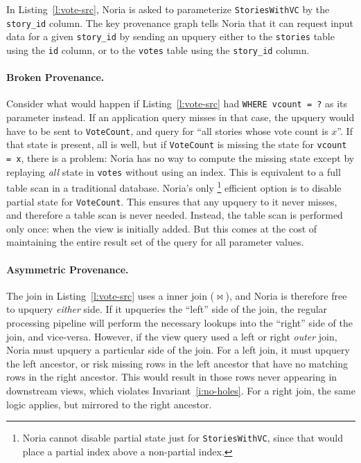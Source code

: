 In Listing~\ref{l:vote-src}, Noria is asked to parameterize
\texttt{StoriesWithVC} by the \texttt{story\_id} column. The key provenance
graph tells Noria that it can request input data for a given \texttt{story\_id}
by sending an upquery either to the \texttt{stories} table using the \texttt{id}
column, or to the \texttt{votes} table using the \texttt{story\_id} column.

\paragraph{Broken Provenance.}
Consider what would happen if Listing~\ref{l:vote-src} had \texttt{WHERE vcount
= ?} as its parameter instead. If an application query misses in that case, the
upquery would have to be sent to \texttt{VoteCount}, and query for ``all stories
whose vote count is $x$''. If that state is present, all is well, but if
\texttt{VoteCount} is missing the state for \texttt{vcount = x}, there is a
problem: Noria has no way to compute the missing state except by replaying
\emph{all} state in \texttt{votes} without using an index. This is equivalent to
a full table scan in a traditional database. Noria's only%
%
\footnote{Noria cannot disable partial state just for \texttt{StoriesWithVC},
since that would place a partial index above a non-partial index.}
%
efficient option is to disable partial
state for \texttt{VoteCount}. This ensures that any upquery to it never misses,
and therefore a table scan is never needed. Instead, the table scan is performed
only once: when the view is initially added. But this comes at the cost of
maintaining the entire result set of the query for all parameter values.

\paragraph{Asymmetric Provenance.}
The join in Listing~\ref{l:vote-src} uses a inner join ($\bowtie$), and Noria is
therefore free to upquery \emph{either} side. If it upqueries the ``left'' side
of the join, the regular processing pipeline will perform the necessary lookups
into the ``right'' side of the join, and vice-versa. However, if the view query
used a left or right \emph{outer} join, Noria must upquery a particular side of
the join. For a left join, it must upquery the left ancestor, or risk missing
rows in the left ancestor that have no matching rows in the right ancestor. This
would result in those rows never appearing in downstream views, which violates
Invariant~\ref{i:no-holes}. For a right join, the same logic applies, but
mirrored to the right ancestor.

